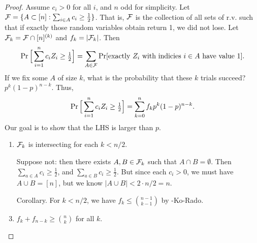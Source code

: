 \begin{proof}	
Assume $c_i >0$ for all $i$, and $n$ odd for simplicity. Let $\mathcal{F} = \{A\subset [n]: \sum_{i\in A} c_i \geq \tfrac{1}{2} \}$. That is, $\mathcal{F}$ is the collection of all sets of r.v. such that if exactly those random variables obtain return 1, we did not lose.
Let $\mathcal{F}_k = \mathcal{F} \cap [n]^{(k)}$ and $f_k = |\mathcal{F}_k|$. Then
\[
\operatorname{Pr} \Big[ \sum_{i=1}^n c_i Z_i \geq \tfrac{1}{2}\Big] = \sum_{A\in \mathcal{F}} \operatorname{Pr} [ \text{exactly }Z_i \text{ with indicies }i\in A \text{ have value 1}].
\]
If we fix some $A$ of size $k$, what is the probability that these $k$ trials succeed? $p^k(1-p)^{n-k}$. Thus,
\[
\operatorname{Pr} \Big[ \sum_{i=1}^n c_i Z_i \geq \tfrac{1}{2}\Big] = \sum_{k=0}^n f_k p^k (1-p)^{n-k}.
\]
Our goal is to show that the LHS is larger than $p$.
\begin{enumerate}[{Fact }1.]
	\item  $\mathcal{F}_k$ is intersecting for each $k < n/2$.

	\begin{subproof}
	Suppose not: then there exists $A,B\in \mathcal{F}_k$ such that $A\cap B = \emptyset$. Then $\sum_{a\in A} c_i \geq \frac{1}{2}$, and $\sum_{a\in B} c_i \geq \frac{1}{2}$. But since each $c_i>0$, we must have $A\cup B = [n]$, but we know $|A\cup B|< 2\cdot n/2=n$.
	\end{subproof}

	\item[Corollary.] For $k<n/2$, we have $f_k \leq {n-1\choose k-1}$ by \erdos-Ko-Rado. 
	\item $f_k + f_{n-k} \geq {n\choose k}$ for all $k$.


\end{enumerate}
\end{proof}
